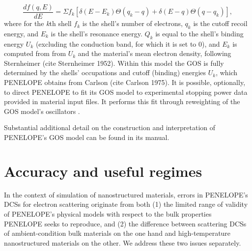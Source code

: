 \documentclass [11pt, proquest, article] {uwthesis}[2016/11/22]
\begin{document}
$$
\frac{df(q, E)}{dE} = \Sigma f_k [\delta(E - E_k) \Theta (q_k - q) + \delta(E-q) \Theta(q - q_k)],
$$
where for the \emph{k}th shell $f_k$ is the shell's number of electrons, $q_k$ is the cutoff recoil energy, and $E_k$ is the shell's resonance energy. $Q_k$ is equal to the shell's binding energy $U_k$ (excluding the conduction band, for which it is set to 0), and $E_k$ is computed from from $U_k$ and the material's mean electron density, following Sternheimer (cite Sternheimer 1952). Within this model the GOS is fully determined by the shells' occupations and cutoff (binding) energies $U_k$, which PENELOPE obtains from Carlson (cite Carlson 1975). It is possible, optionally, to direct PENELOPE to fit its GOS model to experimental stopping power data provided in material input files. It performs this fit through reweighting of the GOS model's oscillators .

Substantial additional detail on the construction and interpretation of PENELOPE's GOS model can be found in its manual.


\section{Accuracy and useful regimes}
In the context of simulation of nanostructured materials, errors in PENELOPE's DCSs for electron scattering originate from both (1) the limited range of validity of PENELOPE's physical models with respect to the bulk properties PENELOPE seeks to reproduce, and (2) the difference between scattering DCSs of ambient-condition bulk materials on the one hand and high-temperature nanostructured materials on the other. We address these two issues separately.
\end{document}
